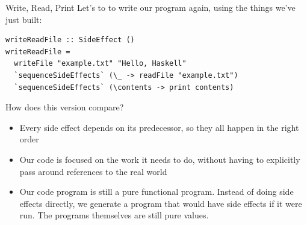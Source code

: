 \documentclass[10pt, presentation, colorlinks]{beamer}
\begin{document}
\begin{frame}[label={sec:org84e10b6},fragile]{Write, Read, Print}
 Let's to to write our program again, using the things we've just built:

\begin{verbatim}
writeReadFile :: SideEffect ()
writeReadFile =
  writeFile "example.txt" "Hello, Haskell"
  `sequenceSideEffects` (\_ -> readFile "example.txt")
  `sequenceSideEffects` (\contents -> print contents)
\end{verbatim}

\bigskip

How does this version compare?

\bigskip

\pause
\begin{itemize}
\item Every side effect depends on its predecessor, so they all happen in the right order
\end{itemize}
\pause
\begin{itemize}
\item Our code is focused on the work it needs to do, without having to explicitly pass around references to the real world
\end{itemize}
\pause
\begin{itemize}
\item Our code program is still a \alert{pure functional program}. Instead of doing side effects directly, we \alert{generate a program} that would have side effects if it were run. The programs themselves are still pure values.
\end{itemize}
\end{frame}
\end{document}
